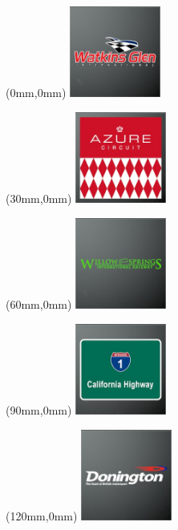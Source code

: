 \begin{textblock*}{30mm}(0mm,0mm)%
\includegraphics[width=30mm]{LG/2015-05-20_00097.png}
\end{textblock*}
\begin{textblock*}{30mm}(30mm,0mm)%
\includegraphics[width=30mm]{LG/2015-05-20_00072.png}
\end{textblock*}
\begin{textblock*}{30mm}(60mm,0mm)%
\includegraphics[width=30mm]{LG/2015-05-20_00098.png}
\end{textblock*}
\begin{textblock*}{30mm}(90mm,0mm)%
\includegraphics[width=30mm]{LG/2015-05-20_00077.png}
\end{textblock*}
\begin{textblock*}{30mm}(120mm,0mm)%
\includegraphics[width=30mm]{LG/2015-05-20_00080.png}
\end{textblock*}
